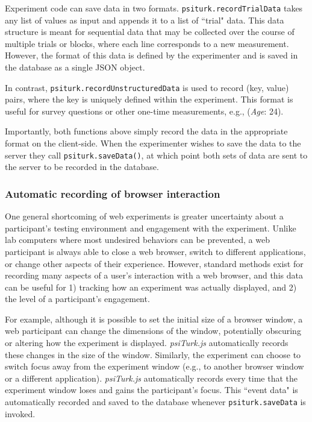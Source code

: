 \documentclass[twocolumn]{svjour3}          %
\begin{document}
Experiment code can save data in two formats.
\texttt{psiturk.recordTrialData} takes any list of values as input and appends it to a list of ``trial" data.
This data structure is meant for sequential data that may be collected over the course of multiple trials or blocks, where each line corresponds to a new measurement.
However, the format of this data is defined by the experimenter and is saved in the database as a single JSON object.

In contrast, \texttt{psiturk.recordUnstructuredData} is used to record (key, value) pairs, where the key is uniquely defined within the experiment.
This format is useful for survey questions or other one-time measurements, e.g., (\emph{Age}: 24).

Importantly, both functions above simply record the data in the appropriate format on the client-side.
When the experimenter wishes to save the data to the server they call \texttt{psiturk.saveData()}, at which point both sets of data are sent to the server to be recorded in the database.

\subsubsection{Automatic recording of browser interaction}
 
One general shortcoming of web experiments is greater uncertainty about a participant's testing environment and engagement with the experiment.
Unlike lab computers where most undesired behaviors can be prevented, a web participant is always able to close a web browser, switch to different applications, or change other aspects of their experience.
However, standard methods exist for recording many aspects of a user's interaction with a web browser, and this data can be useful for 1) tracking how an experiment was actually displayed, and 2) the level of a participant's engagement.

For example, although it is possible to set the initial size of a browser window, a web participant can change the dimensions of the window, potentially obscuring or altering how the experiment is displayed.
\emph{psiTurk.js} automatically records these changes in the size of the window.
Similarly, the experiment can choose to switch focus away from the experiment window (e.g., to another browser window or a different application).
\emph{psiTurk.js} automatically records every time that the experiment window loses and gains the participant's focus.
This ``event data" is automatically recorded and saved to the database whenever \texttt{psiturk.saveData} is invoked. \\
\end{document}

